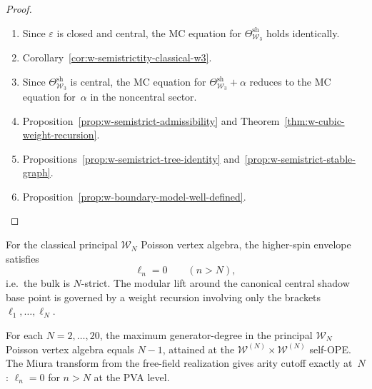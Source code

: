 \begin{proof}
\leavevmode
\begin{enumerate}[label=\textup{(\roman*)}]
\item Since $\varepsilon$ is closed and central, the MC equation for
$\Theta_{\mathcal{W}_3}^{\mathrm{sh}}$ holds identically.

\item Corollary~\ref{cor:w-semistrictity-classical-w3}.

\item Since $\Theta_{\mathcal{W}_3}^{\mathrm{sh}}$ is central, the
MC equation for
$\Theta_{\mathcal{W}_3}^{\mathrm{sh}} + \alpha$ reduces to the MC
equation for~$\alpha$ in the noncentral sector.

\item Proposition~\ref{prop:w-semistrict-admissibility} and
Theorem~\ref{thm:w-cubic-weight-recursion}.

\item Propositions~\ref{prop:w-semistrict-tree-identity}
and~\ref{prop:w-semistrict-stable-graph}.

\item Proposition~\ref{prop:w-boundary-model-well-defined}.
\qedhere
\end{enumerate}
\end{proof}

\begin{conjecture}
\label{conj:w-finite-arity-WN}
For the classical principal $\mathcal{W}_N$ Poisson vertex algebra,
the higher-spin envelope satisfies
\[
\ell_n = 0 \qquad (n > N),
\]
i.e.\ the bulk is $N$-strict.  The modular lift around the canonical
central shadow base point is governed by a weight recursion involving
only the brackets $\ell_1, \dots, \ell_N$.
\end{conjecture}

\begin{proposition}
\label{prop:miura-arity-sharp}
\ClaimStatusProvedHere
{}
For each $N = 2, \ldots, 20$, the maximum generator-degree in the
principal $\mathcal{W}_N$ Poisson vertex algebra equals $N - 1$,
attained at the $\mathcal{W}^{(N)} \times \mathcal{W}^{(N)}$
self-OPE.  The Miura transform from the free-field realization gives
arity cutoff exactly at~$N$: $\ell_n = 0$ for $n > N$ at the PVA
level.
\end{proposition}


